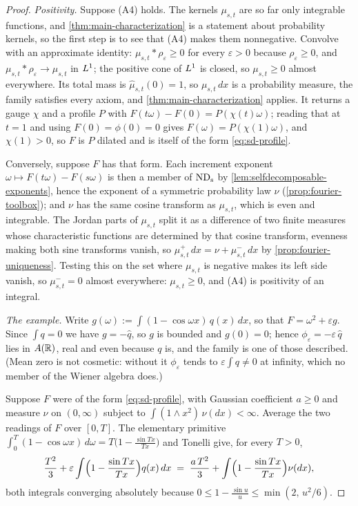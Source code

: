 \begin{proof}
\emph{Positivity.} Suppose (A4) holds. The kernels $\mu_{s,t}$ are so far only integrable
functions, and \ref{thm:main-characterization} is a statement about probability kernels, so the
first step is to see that (A4) makes them nonnegative. Convolve with an approximate identity:
$\mu_{s,t} * \rho_\varepsilon \ge 0$ for every $\varepsilon > 0$ because $\rho_\varepsilon \ge 0$,
and $\mu_{s,t} * \rho_\varepsilon \to \mu_{s,t}$ in $L^1$; the positive cone of $L^1$ is
closed, so $\mu_{s,t} \ge 0$ almost everywhere. Its total mass is $\hat\mu_{s,t}(0) = 1$, so
$\mu_{s,t}\,dx$ is a probability measure, the family satisfies every axiom, and
\ref{thm:main-characterization} applies. It returns a gauge $\chi$ and a profile $P$ with
$F(t\omega) - F(0) = P(\chi(t)\omega)$; reading that at $t = 1$ and using $F(0) = \phi(0) = 0$
gives $F(\omega) = P(\chi(1)\omega)$, and $\chi(1) > 0$, so $F$ is $P$ dilated and is itself of
the form \ref{eq:sd-profile}.

Conversely, suppose $F$ has that form. Each increment exponent
$\omega \mapsto F(t\omega) - F(s\omega)$ is then a member of $\mathrm{ND}_{\mathrm{s}}$ by
\ref{lem:selfdecomposable-exponents}, hence the exponent of a symmetric probability law $\nu$
(\ref{prop:fourier-toolbox}); and $\nu$ has the same cosine transform as $\mu_{s,t}$, which is
even and integrable. The Jordan parts of $\mu_{s,t}$ split it as a difference of two finite
measures whose characteristic functions are determined by that cosine transform, evenness
making both sine transforms vanish, so $\mu_{s,t}^+\,dx = \nu + \mu_{s,t}^-\,dx$ by
\ref{prop:fourier-uniqueness}. Testing this on the set where $\mu_{s,t}$ is negative makes its
left side vanish, so $\mu_{s,t}^- = 0$ almost everywhere: $\mu_{s,t} \ge 0$, and (A4) is
positivity of an integral.

\emph{The example.} Write $g(\omega) := \int (1 - \cos\omega x)\,q(x)\,dx$, so that
$F = \omega^2 + \varepsilon g$. Since $\int q = 0$ we have $g = -\hat q$, so $g$ is bounded and
$g(0) = 0$; hence $\phi_\varepsilon = -\varepsilon\,\hat q$ lies in $A(\mathbb{R})$, real and even
because $q$ is, and the family is one of those described. (Mean zero is not cosmetic: without
it $\phi_\varepsilon$ tends to $\varepsilon\int q \ne 0$ at infinity, which no member of the
Wiener algebra does.)

Suppose $F$ were of the form \ref{eq:sd-profile}, with Gaussian coefficient $a \ge 0$ and
\Levy{} measure $\nu$ on $(0,\infty)$ subject to $\int (1 \wedge x^2)\,\nu(dx) < \infty$.
Average the two readings of $F$ over $[0,T]$. The elementary primitive
$\int_0^T (1 - \cos\omega x)\,d\omega = T\bigl(1 - \frac{\sin Tx}{Tx}\bigr)$ and Tonelli give,
for every $T > 0$,
\[
  \frac{T^2}{3}
   + \varepsilon\int \Bigl(1 - \frac{\sin Tx}{Tx}\Bigr) q(x)\,dx
  \;=\; \frac{a\,T^2}{3}
   + \int \Bigl(1 - \frac{\sin Tx}{Tx}\Bigr) \nu(dx),
\]
both integrals converging absolutely because
$0 \le 1 - \frac{\sin u}{u} \le \min(2,\, u^2/6)$.


\end{proof}
